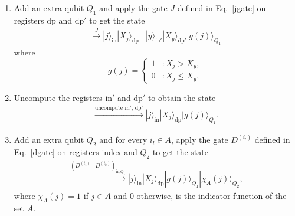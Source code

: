 \documentclass[a4paper,twocolumn,11pt,unpublished]{quantumarticle}
\newcommand{\rang}{\rangle}
\begin{document}
\begin{enumerate}
        \item 
            Add an extra qubit $Q_1$ and apply the gate $J$ defined in Eq.~\eqref{jgate} on registers dp and dp$'$ to get the state
        \begin{equation}
            \begin{split}
                \xrightarrow{J}|j\rang_\text{in} |X_j\rang_\text{dp} &|y\rang_\text{in$'$} |X_y\rang_{\text{dp$'$}} |g(j)\rang_{Q_1}
            \end{split}
        \end{equation}
        where
        \begin{equation}
            g(j) = 
            \begin{cases}
                1 &: X_j >X_y, \\
                0 &: X_j \leq X_y,
            \end{cases}
        \end{equation}
        \item 
            Uncompute the registers in$'$ and dp$'$ to obtain the state
            \begin{equation}
                \begin{split}
                    \xrightarrow{\text{uncompute in$'$, dp$'$}}|j\rang_\text{in} |X_j\rang_\text{dp}|g(j)\rang_{Q_1}.
                \end{split}
            \end{equation} \label{saving_m_qubits_dp}
        \item 
            Add an extra qubit $Q_2$ and for every $i_l \in A$, apply the gate $D^{(i_l)}$ defined in Eq.~\eqref{dgate} on registers index and $Q_2$ to get the state
            \begin{equation}
            \begin{split}    
                \xrightarrow{\left(D^{(i_1)} \cdots D^{(i_k)}\right)_{\text{in,}Q_1}} |j\rang_\text{in} |X_j\rang_\text{dp} |g(j)\rang_{Q_1} |\chi_A(j)\rang_{Q_2},
            \end{split}
            \end{equation}
            where $\chi_A(j) = 1$ if $j \in A$ and $0$ otherwise, is the indicator function of the set $A$. 
            

\end{enumerate}
\end{document}
